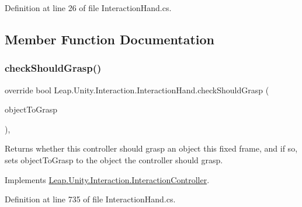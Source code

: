 Definition at line 26 of file Interaction\+Hand.\+cs.



\subsection{Member Function Documentation}
\mbox{\label{class_leap_1_1_unity_1_1_interaction_1_1_interaction_hand_ae9cb040d9827bec38bf1c1b3560d7cbb}} 
\subsubsection{\texorpdfstring{checkShouldGrasp()}{checkShouldGrasp()}}
{\footnotesize\ttfamily override bool Leap.\+Unity.\+Interaction.\+Interaction\+Hand.\+check\+Should\+Grasp (\begin{DoxyParamCaption}\item[{out \mbox{\hyperlink{interface_leap_1_1_unity_1_1_interaction_1_1_i_interaction_behaviour}{I\+Interaction\+Behaviour}}}]{object\+To\+Grasp }\end{DoxyParamCaption})\hspace{0.3cm}{\ttfamily [protected]}, {\ttfamily [virtual]}}



Returns whether this controller should grasp an object this fixed frame, and if so, sets object\+To\+Grasp to the object the controller should grasp. 



Implements \mbox{\hyperlink{class_leap_1_1_unity_1_1_interaction_1_1_interaction_controller_a672d3a9313dbe37a693702024a61657d}{Leap.\+Unity.\+Interaction.\+Interaction\+Controller}}.



Definition at line 735 of file Interaction\+Hand.\+cs.

\mbox{\label{class_leap_1_1_unity_1_1_interaction_1_1_interaction_hand_a278a920f19b3a940628ddf08c502c7e0}} 
